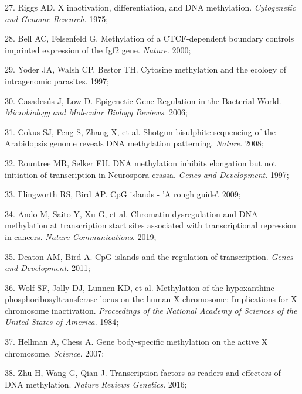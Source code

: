 \documentclass[11pt,oneside]{bristolthesis}
\newenvironment{cslreferences}%
  {}%
  {\par}
\begin{document}
\begin{cslreferences}
\leavevmode\hypertarget{ref-Riggs1975}{}%
27. Riggs AD. X inactivation, differentiation, and DNA methylation. \emph{Cytogenetic and Genome Research}. 1975;

\leavevmode\hypertarget{ref-Bell2000}{}%
28. Bell AC, Felsenfeld G. Methylation of a CTCF-dependent boundary controls imprinted expression of the Igf2 gene. \emph{Nature}. 2000;

\leavevmode\hypertarget{ref-Yoder1997}{}%
29. Yoder JA, Walsh CP, Bestor TH. Cytosine methylation and the ecology of intragenomic parasites. 1997;

\leavevmode\hypertarget{ref-Casadesus2006}{}%
30. Casadesús J, Low D. Epigenetic Gene Regulation in the Bacterial World. \emph{Microbiology and Molecular Biology Reviews}. 2006;

\leavevmode\hypertarget{ref-Cokus2008}{}%
31. Cokus SJ, Feng S, Zhang X, et al. Shotgun bisulphite sequencing of the Arabidopsis genome reveals DNA methylation patterning. \emph{Nature}. 2008;

\leavevmode\hypertarget{ref-Rountree1997}{}%
32. Rountree MR, Selker EU. DNA methylation inhibits elongation but not initiation of transcription in Neurospora crassa. \emph{Genes and Development}. 1997;

\leavevmode\hypertarget{ref-Illingworth2009}{}%
33. Illingworth RS, Bird AP. CpG islands - 'A rough guide'. 2009;

\leavevmode\hypertarget{ref-Ando2019}{}%
34. Ando M, Saito Y, Xu G, et al. Chromatin dysregulation and DNA methylation at transcription start sites associated with transcriptional repression in cancers. \emph{Nature Communications}. 2019;

\leavevmode\hypertarget{ref-Deaton2011}{}%
35. Deaton AM, Bird A. CpG islands and the regulation of transcription. \emph{Genes and Development}. 2011;

\leavevmode\hypertarget{ref-Wolf1984}{}%
36. Wolf SF, Jolly DJ, Lunnen KD, et al. Methylation of the hypoxanthine phosphoribosyltransferase locus on the human X chromosome: Implications for X chromosome inactivation. \emph{Proceedings of the National Academy of Sciences of the United States of America}. 1984;

\leavevmode\hypertarget{ref-Hellman2007}{}%
37. Hellman A, Chess A. Gene body-specific methylation on the active X chromosome. \emph{Science}. 2007;

\leavevmode\hypertarget{ref-Zhu2016}{}%
38. Zhu H, Wang G, Qian J. Transcription factors as readers and effectors of DNA methylation. \emph{Nature Reviews Genetics}. 2016;


\end{cslreferences}
\end{document}
